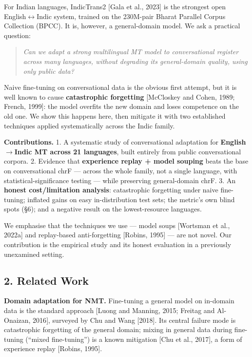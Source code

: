 \documentclass[
  11pt,
]{article}
\begin{document}
For Indian languages, IndicTrans2 {[}Gala et al., 2023{]} is the
strongest open English$\leftrightarrow$Indic system, trained on the 230M-pair Bharat
Parallel Corpus Collection (BPCC). It is, however, a general-domain
model. We ask a practical question:

\begin{quote}
\emph{Can we adapt a strong multilingual MT model to conversational
register across many languages, without degrading its general-domain
quality, using only public data?}
\end{quote}

Naive fine-tuning on conversational data is the obvious first attempt,
but it is well known to cause \textbf{catastrophic forgetting}
{[}McCloskey and Cohen, 1989; French, 1999{]}: the model overfits the
new domain and loses competence on the old one. We show this happens
here, then mitigate it with two established techniques applied
systematically across the Indic family.

\textbf{Contributions.} 1. A systematic study of conversational
adaptation for \textbf{English$\to$Indic MT across 21 languages}, built
entirely from public conversational corpora. 2. Evidence that
\textbf{experience replay + model souping} beats the base on
conversational chrF --- across the whole family, not a single language,
with statistical-significance testing --- while preserving
general-domain chrF. 3. An \textbf{honest cost/limitation analysis}:
catastrophic forgetting under naive fine-tuning; inflated gains on easy
in-distribution test sets; the metric's own blind spots (§6); and a
negative result on the lowest-resource languages.

We emphasise that the techniques we use --- model soups {[}Wortsman et
al., 2022a{]} and replay-based anti-forgetting {[}Robins, 1995{]} ---
are not novel. Our contribution is the empirical study and its honest
evaluation in a previously unexamined setting.

\hypertarget{related-work}{%
\subsection{2. Related Work}\label{related-work}}

\textbf{Domain adaptation for NMT.} Fine-tuning a general model on
in-domain data is the standard approach {[}Luong and Manning, 2015;
Freitag and Al-Onaizan, 2016{]}, surveyed by Chu and Wang {[}2018{]}.
Its central failure mode is catastrophic forgetting of the general
domain; mixing in general data during fine-tuning (``mixed
fine-tuning'') is a known mitigation {[}Chu et al., 2017{]}, a form of
experience replay {[}Robins, 1995{]}.
\end{document}
